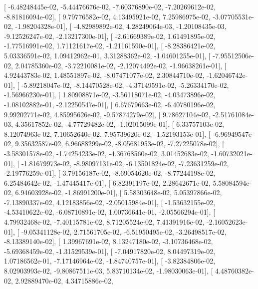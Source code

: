 \documentclass{article}
\begin{document}
       [ -6.48248445e-02,  -5.44476676e-02,  -7.60376890e-02,
         -7.20269612e-02,  -8.81816094e-02],
       [  9.79776582e-02,   4.13495921e-02,   7.25986975e-02,
         -3.07705531e-02,  -1.98204328e-01],
       [ -4.82989892e-02,   4.28249064e-03,  -1.20108435e-03,
         -9.12526247e-02,  -2.13217300e-01],
       [ -2.61669389e-02,   1.61491895e-02,  -1.77516991e-02,
          1.71121617e-02,  -1.21161590e-01],
       [ -8.28386421e-02,   5.03336591e-02,   1.09412962e-01,
          3.31288362e-02,  -1.04601255e-01],
       [ -7.95512506e-02,   2.04785360e-02,  -3.72210081e-02,
         -2.12074492e-02,  -1.96638261e-01],
       [  4.92443783e-02,   1.48551897e-02,  -8.07471077e-02,
          2.30844710e-02,  -1.62046742e-01],
       [ -5.89218047e-02,  -8.14470528e-02,  -4.37149591e-02,
         -5.26334170e-02,  -1.56966230e-01],
       [  1.80908871e-02,  -3.56118071e-02,  -4.03473896e-02,
         -1.08102882e-01,  -2.12250547e-01],
       [  6.67679663e-02,  -6.40780196e-02,   9.99202771e-02,
          4.85995626e-02,  -9.57874279e-02],
       [  9.78627104e-02,  -2.51761084e-03,   4.35617852e-02,
         -4.77729482e-02,  -1.02015099e-01],
       [  6.33757103e-02,   8.12074963e-02,   7.10652640e-02,
          7.95739620e-02,  -1.52193153e-01],
       [ -6.96949547e-02,   9.35632587e-02,   6.96688299e-02,
         -8.05681953e-02,  -7.27225078e-02],
       [ -3.58301578e-02,  -1.74254233e-02,  -4.36768560e-02,
          3.01452683e-02,  -1.60732021e-01],
       [ -1.81679973e-02,  -8.98097131e-02,  -6.13501824e-02,
         -7.23631259e-02,  -2.19776259e-01],
       [  3.79156187e-02,  -8.69054620e-02,  -8.77244198e-02,
          6.25484642e-02,  -1.47445417e-01],
       [  6.82391197e-02,   2.28642671e-02,   5.58084594e-02,
          6.94603928e-02,  -1.86991200e-01],
       [  5.58303648e-02,   5.05397866e-02,  -7.13890337e-02,
          4.12183856e-02,  -2.05015984e-01],
       [ -1.53632155e-02,  -4.53410622e-02,  -6.08710891e-02,
          1.00736641e-01,  -2.05566294e-01],
       [  4.79932468e-02,  -7.40115781e-02,   8.71205524e-02,
          7.41391916e-02,  -2.16052623e-01],
       [ -9.05341128e-02,   2.71561705e-02,  -6.51950495e-02,
         -3.26498517e-02,  -8.13389140e-02],
       [  1.39967691e-02,   8.13247180e-02,  -3.10736468e-02,
         -5.69368459e-02,  -1.31529539e-01],
       [ -7.04917820e-02,   8.04497319e-02,   1.07186562e-01,
         -7.17146964e-02,  -1.84740757e-01],
       [ -3.82384806e-02,   8.02903993e-02,  -9.80867511e-03,
          5.83710134e-02,  -1.98030063e-01],
       [  4.48760382e-02,   2.92889470e-02,   4.34715886e-02,
\end{document}
